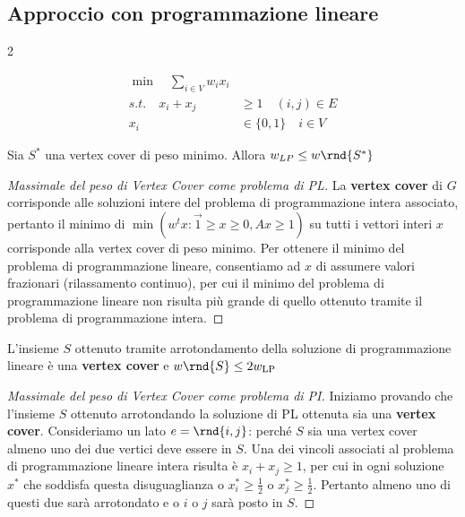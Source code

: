 \documentclass[\main/main.tex]{subfiles}
\begin{document}
\subsection{Approccio con programmazione lineare}
\begin{multicols}{2}
\begin{definition}
\begin{align*}
  \min \quad \sum_{i \in V} w_{i} x_{i}&\\  
  s.t. \quad x_{i}+x_{j} &\geq 1 \quad(i, j) \in E\\
  x_{i} &\in\{0,1\} \quad i \in V
\end{align*}
\end{definition}
\begin{lemma}
    Sia \(S^*\) una vertex cover di peso minimo. Allora \(w_{LP} \leq w\rnd{S^*}\)
\end{lemma}
\begin{proof}[Massimale del peso di Vertex Cover come problema di PL]
    La \textbf{vertex cover} di \(G\) corrisponde alle soluzioni intere del problema di programmazione intera associato, pertanto il minimo di \(\min \left(w^{t} x : \overrightarrow{1} \geq x \geq 0, A x \geq 1\right)\) su tutti i vettori interi \(x\) corrisponde alla vertex cover di peso minimo. Per ottenere il minimo del problema di programmazione lineare, consentiamo ad \(x\) di assumere valori frazionari (rilassamento continuo), per cui il minimo del problema di programmazione lineare non risulta più grande di quello ottenuto tramite il problema di programmazione intera.
\end{proof}
\vfill\null
\columnbreak
\begin{lemma}
    L'insieme \(S\) ottenuto tramite arrotondamento della soluzione di programmazione lineare è una \textbf{vertex cover} e \(w\rnd{S} \leq 2 w_{\text{LP}}\)
\end{lemma}
\begin{proof}[Massimale del peso di Vertex Cover come problema di PI]
    Iniziamo provando che l'insieme \(S\) ottenuto arrotondando la soluzione di PL ottenuta sia una \textbf{vertex cover}. Consideriamo un lato \(e = \rnd{i,j}\): perché \(S\) sia una vertex cover almeno uno dei due vertici deve essere in \(S\). Una dei vincoli associati al problema di programmazione lineare intera risulta è \(x_{i}+x_{j} \geq 1\), per cui in ogni soluzione \(x^*\) che soddisfa questa disuguaglianza o \(x_{i}^{*} \geq \frac{1}{2}\) o \(x_{j}^{*} \geq \frac{1}{2}\). Pertanto almeno uno di questi due sarà arrotondato e o \(i\) o \(j\) sarà posto in \(S\).
    

\end{proof}
\end{multicols}
\end{document}
